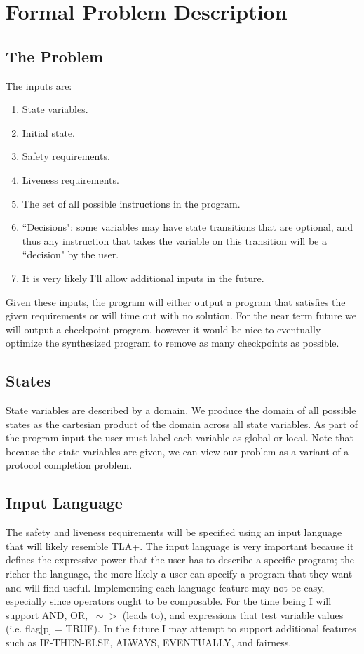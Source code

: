 \documentclass[12pt]{article}
\begin{document}
\section{Formal Problem Description}
\subsection{The Problem}
The inputs are:
	\begin{enumerate}
		\item State variables.  
		\item Initial state.  
		\item Safety requirements.  
		\item Liveness requirements.  
		\item The set of all possible instructions in the program.  
		\item ``Decisions": some variables may have state transitions that are optional, and thus any instruction that takes the variable on this transition will be a ``decision" by the user.  
		\item It is very likely I'll allow additional inputs in the future.  
	\end{enumerate}

Given these inputs, the program will either output a program that satisfies the given requirements or will time out with no solution.  For the near term future we will output a checkpoint program, however it would be nice to eventually optimize the synthesized program to remove as many checkpoints as possible. 

\subsection{States}
State variables are described by a domain.  We produce the domain of all possible states as the cartesian product of the domain across all state variables.  As part of the program input the user must label each variable as global or local.  Note that because the state variables are given, we can view our problem as a variant of a protocol completion problem.  

\subsection{Input Language}
The safety and liveness requirements will be specified using an input language that will likely resemble TLA+.  The input language is very important because it defines the expressive power that the user has to describe a specific program; the richer the language, the more likely a user can specify a program that they want and will find useful.  Implementing each language feature may not be easy, especially since operators ought to be composable.  For the time being I will support AND, OR, $~\sim>$ (leads to), and expressions that test variable values (i.e. flag[p] = TRUE).  In the future I may attempt to support additional features such as IF-THEN-ELSE, ALWAYS, EVENTUALLY, and fairness.  
\end{document}
